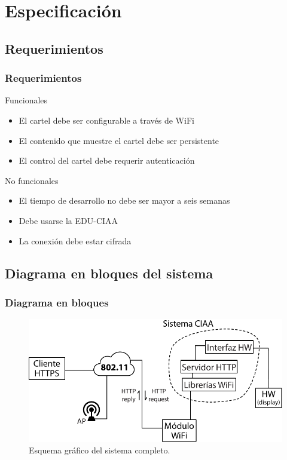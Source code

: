 \section{Especificación}

\subsection{Requerimientos}
\begin{frame}
	\frametitle{Requerimientos}
	\begin{block}{Funcionales}
		\begin{itemize}
			\item El cartel debe ser configurable a través de WiFi
			\item El contenido que muestre el cartel debe ser persistente
			\item El control del cartel debe requerir autenticación
		\end{itemize}
	\end{block}

	\begin{block}{No funcionales}
		\begin{itemize}
			\item El tiempo de desarrollo no debe ser mayor a seis semanas
			\item Debe usarse la EDU-CIAA
			\item La conexión debe estar cifrada
		\end{itemize}
	\end{block}

\end{frame}

\subsection{Diagrama en bloques del sistema}
\begin{frame}
	\frametitle{Diagrama en bloques}
	\begin{figure}[htbp]
		\begin{center}
			\includegraphics[width=\textwidth]{diagramas/diagrama-bloques-2.pdf}
			\caption{Esquema gráfico del sistema completo.}
			\label{fig:diagrama-bloques}
		\end{center}
	\end{figure}
\end{frame}

